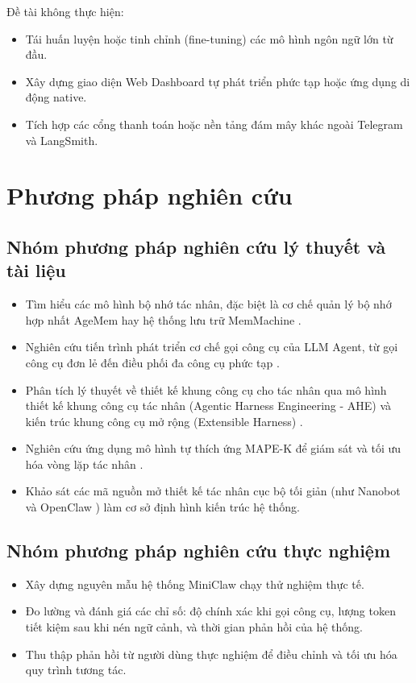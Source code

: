 Đề tài không thực hiện:
\begin{itemize}
  \item Tái huấn luyện hoặc tinh chỉnh (fine-tuning) các mô hình ngôn ngữ lớn từ đầu.
  \item Xây dựng giao diện Web Dashboard tự phát triển phức tạp hoặc ứng dụng di động native.
  \item Tích hợp các cổng thanh toán hoặc nền tảng đám mây khác ngoài Telegram và LangSmith.
\end{itemize}

\section{Phương pháp nghiên cứu}

\subsection{Nhóm phương pháp nghiên cứu lý thuyết và tài liệu}
\begin{itemize}
  \item Tìm hiểu các mô hình bộ nhớ tác nhân, đặc biệt là cơ chế quản lý bộ nhớ hợp nhất AgeMem \cite{yu2026agentic} hay hệ thống lưu trữ MemMachine \cite{memverge2026memmachine}.
  \item Nghiên cứu tiến trình phát triển cơ chế gọi công cụ của LLM Agent, từ gọi công cụ đơn lẻ đến điều phối đa công cụ phức tạp \cite{xu2026evolution}.
  \item Phân tích lý thuyết về thiết kế khung công cụ cho tác nhân qua mô hình thiết kế khung công cụ tác nhân (Agentic Harness Engineering - AHE) \cite{ahe2026agentic} và kiến trúc khung công cụ mở rộng (Extensible Harness) \cite{lastharness2026last}.
  \item Nghiên cứu ứng dụng mô hình tự thích ứng MAPE-K để giám sát và tối ưu hóa vòng lặp tác nhân \cite{emergentmindmape}.
  \item Khảo sát các mã nguồn mở thiết kế tác nhân cục bộ tối giản (như Nanobot \cite{hkudsnanobot} và OpenClaw \cite{openclawproject}) làm cơ sở định hình kiến trúc hệ thống.
\end{itemize}

\subsection{Nhóm phương pháp nghiên cứu thực nghiệm}
\begin{itemize}
  \item Xây dựng nguyên mẫu hệ thống MiniClaw chạy thử nghiệm thực tế.
  \item Đo lường và đánh giá các chỉ số: độ chính xác khi gọi công cụ, lượng token tiết kiệm sau khi nén ngữ cảnh, và thời gian phản hồi của hệ thống.
  \item Thu thập phản hồi từ người dùng thực nghiệm để điều chỉnh và tối ưu hóa quy trình tương tác.
\end{itemize}

